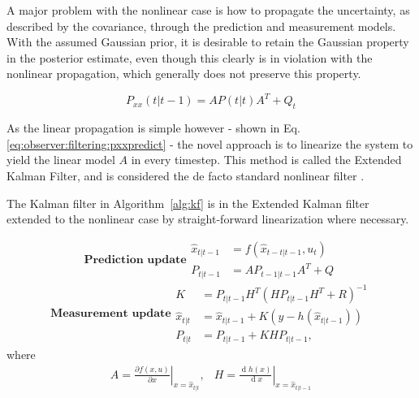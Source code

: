     A major problem with the nonlinear case is how to propagate the uncertainty,
    as described by the covariance, through the prediction and measurement models.
    With the assumed Gaussian prior, it is desirable to retain the Gaussian
    property in the posterior estimate, even though this clearly is in violation with the
    nonlinear propagation, which generally does not preserve this property.

    \begin{equation}
        \label{eq:observer:filtering:pxxpredict}
        P_{xx}(t|t-1) = AP(t|t)A^{T} + Q_{t}
    \end{equation}

    As the linear propagation is simple however - shown in Eq. \eqref{eq:observer:filtering:pxxpredict} - the
    novel approach is to linearize the system to yield the linear model $A$ in every timestep.
    This method is called the Extended Kalman Filter, and is considered the
    de facto standard nonlinear filter \cite{Julier04nonlinear}.

    \begin{algorithm}
        \label{alg:ekf}
        The Kalman filter in Algorithm~\ref{alg:kf} is in the Extended Kalman filter extended to the
        nonlinear case by straight-forward linearization where necessary.

        \begin{subequations}
            \textbf{Prediction update}
            \begin{align}
                \hat{x}_{t|t-1} &= f\left( \hat{x}_{t-t|t-1}, u_{t} \right) \\
                P_{t|t-1} &= A P_{t-1|t-1} A^{T} + Q
            \end{align}
        \end{subequations}
        \begin{subequations}\textbf{Measurement update}
            \begin{align}
                K &= P_{t|t-1} H^{T} \left( H P_{t|t-1} H^{T} + R \right)^{-1} \label{eq:filtering:kalmanK} \\
                \hat{x}_{t|t} &= \hat{x}_{t|t-1} + K \left( y - h(\hat{x}_{t|t-1}) \right) \\
                P_{t|t} &= P_{t|t-1} + K H P_{t|t-1},
            \end{align}
        \end{subequations}
        where
        \begin{equation}
            \begin{array}{cc}
                A = \left.\frac{\partial f(x,u)}{\partial x}\right|_{x = \hat{x}_{t|t}}, & H = \left.\frac{\operatorname{d}\!h(x)}{\operatorname{d}\!x}\right|_{x = \hat{x}_{t|t-1}}
            \end{array}
        \end{equation}
    \end{algorithm}

